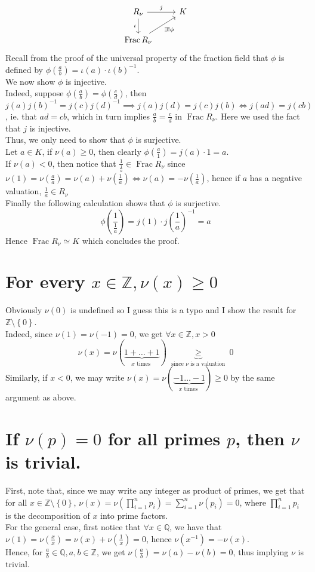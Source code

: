 \documentclass[11pt, a4paper]{article}
\DeclareMathOperator{\fr}{Frac}
\begin{document}
\[\begin{tikzcd}
	{R_\nu} & K \\
	{\fr R_\nu}
	\arrow["j", from=1-1, to=1-2]
	\arrow["\iota"', from=1-1, to=2-1]
	\arrow["{\exists ! \phi}"', from=2-1, to=1-2]
\end{tikzcd}\]
Recall from the proof of the universal property of the fraction field that $\phi$ is defined by
$\phi( \frac{a}{b}) = \iota( a) \cdot \iota( b) ^{-1}$.\\
We now show $\phi$ is injective.\\
Indeed, suppose $\phi( \frac{a}{b}) = \phi( \frac{c}{d}) $, then $j ( a) j( b) ^{-1}= j( c) j( d)^{-1}\implies j(a ) j( d) = j( c) j(b)\iff j( ad) = j( cb) $, ie. that $ad= cb$, which in turn implies $\frac{a}{b}= \frac{c}{d}$ in $ \fr R_\nu$. Here we used the fact that $j$ is injective. \\
Thus, we only need to show that $\phi$ is surjective.\\
Let $a\in K$, if $\nu( a) \geq 0$, then clearly $ \phi( \frac{a}{1}) = j( a) \cdot 1= a$.\\
If $\nu( a) <0$, then notice that $\frac{1}{\frac{1}{a}}\in \fr R_\nu$ since $ \nu( 1) = \nu( \frac{a}{a}) = \nu( a) + \nu( \frac{1}{a}) \iff \nu( a) = -\nu( \frac{1}{a}) $, hence if $a$ has a negative valuation, $\frac{1}{a}\in R_\nu$   \\
Finally the following calculation shows that $\phi$ is surjective.
\[
\phi\left( \frac{1}{\frac{1}{a}}\right) = j( 1) \cdot j\left( \frac{1}{a}\right)^{-1} = a 
\]
Hence $ \fr R_\nu \simeq K$ which concludes the proof.

\section{ For every $x\in \mathbb{Z}, \nu( x) \geq 0$ }
Obviously $ \nu( 0) $ is undefined so I guess this is a typo and I show the result for $ \mathbb{Z}\setminus \left\{ 0 \right\} $.\\

Indeed, since $\nu( 1) =\nu( -1) =0$, we get $\forall x \in \mathbb{Z}, x >0$ 
\[ 
\nu(x) = \nu( \underbrace{1+\ldots + 1}_{ x \text{ times } }) \underbrace{\geq}_{ \text{ since $\nu$ is a valuation } } 0 
\]
Similarly, if $x<0$, we may write $ \nu( x) = \nu( \underbrace{-1\ldots-1}_{x \text{ times } }) \geq 0 $ by the same argument as above.
\section{ If $\nu( p) =0$ for all primes $p$, then $\nu$ is trivial.}
First, note that, since we may write any integer as product of primes, we get that for all $x\in \mathbb{Z}\setminus \left\{ 0 \right\} $, $\nu( x) = \nu\left( \prod_{i=1}^{n} p_i\right) = \sum_{i=1}^{ n} \nu( p_i) = 0 $, where $\prod_{i=1}^{n}p_i$ is the decomposition of $x$ into prime factors.\\
For the general case, first notice that $\forall x\in \mathbb{Q}$, we have that $\nu( 1) = \nu( \frac{x}{x}) = \nu( x ) +\nu( \frac{1}{x}) =0$, hence $\nu( x^{-1}) = -\nu( x) $.\\
Hence, for $\frac{a}{b}\in \mathbb{Q}, a,b \in \mathbb{Z}$, we get $\nu( \frac{a}{b})= \nu( a ) -\nu( b) =0 $, thus implying $\nu$  is trivial.
\end{document}
